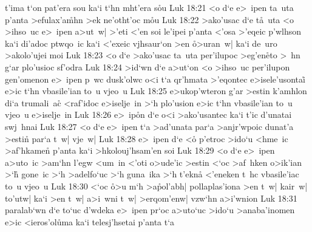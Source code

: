 t'ima
t`on
pat'era
sou
ka`i
t`hn
mht'era
s\r{o}u\bibvsend
{}
\vs Luk 18:21
<o
d`e
e>~ipen
ta~uta
p'anta
>efulax'a\r{m}hn
>ek
ne'otht'oc
m\r{o}u\bibvsend
{}
\vs Luk 18:22
>ako'usac
d`e
t\r{a}~uta
<o
>ihso~uc
e>~ipen
a>ut~w|
>'eti
<'en
soi
le'ipei
p'anta
<'osa
>'eqeic
p'wlhson
ka`i
di'adoc
ptwqo~ic
ka`i
<'exeic
vjhsaur`on
>en
\r{o}>uran~w|
ka`i
de~uro
>akolo'ujei
moi\bibvsend
\vs Luk 18:23
<o
d`e
>ako'usac
ta~uta
per'ilupoc
>eg'en\r{e}to
>~hn
g`ar
plo'usioc
sf'odra\bibvsend
\vs Luk 18:24
>id`wn
d`e
a>ut`on
<o
>ihso~uc
per'ilupon
gen'omenon
e>~ipen
p~wc
dusk'olwc
o<i
t`a
qr'hmata
>'eqontec
e>isele'usontai\r{}
e>ic
t`hn
vbasile'ian
to~u
vjeo~u\bibvsend
\vs Luk 18:25
e>ukop'wteron
g'ar
>estin
k'amhlon
di`a
trumali~ac\r{}
<raf'idoc
e>iselje~in
>`h
plo'usion
e>ic
t`hn
vbasile'ian
to~u
vjeo~u
e>iselje~in\bibvsend
\vs Luk 18:26
e>~ip\r{o}n
d`e
o<i
>ako'usantec
ka`i
t'ic
d'unatai
swj~hnai\bibvsend
\vs Luk 18:27
<o
d`e
e>~ipen
t`a
>ad'unata
par`a
>anjr'wpoic
dunat'a
>estin\r{}
par`a
t~w|
vje~w|\bibvsend
\vs Luk 18:28
e>~ipen
d`e
<o\r{}
p'etroc
>ido`u
<hme~ic
>af'hkamen\r{}
p'anta
ka`i
>hkolouj'hsam'en
soi\bibvsend
\vs Luk 18:29
<o
d`e
e>~ipen
a>uto~ic
>am`hn
l'egw
<um~in
<'oti
o>ude'ic
>estin
<`oc
>af~hken
o>ik'ian
>`h\r{}
gone~ic
>`h
>adelfo`uc
>`h
guna~ika
>`h
t'ekn\r{a}
<'eneken
t~hc
vbasile'iac
to~u
vjeo~u\bibvsend
\vs Luk 18:30
<`oc
\r{o}>u
m`h
>a\r{p}ol'abh|
pollaplas'iona
>en
t~w|
kair~w|
to'utw|
ka`i
>en
t~w|
a>i~wni
t~w|
>erqom'enw|
vzw`hn
a>i'wnion\bibvsend
\vs Luk 18:31
paralab`wn
d`e
to`uc
d'wdeka
e>~ipen
pr`oc
a>uto`uc
>ido`u
>anaba'inomen
e>ic
<ieros'ol\r{u}ma
ka`i
telesj'hsetai
p'anta
t`a
